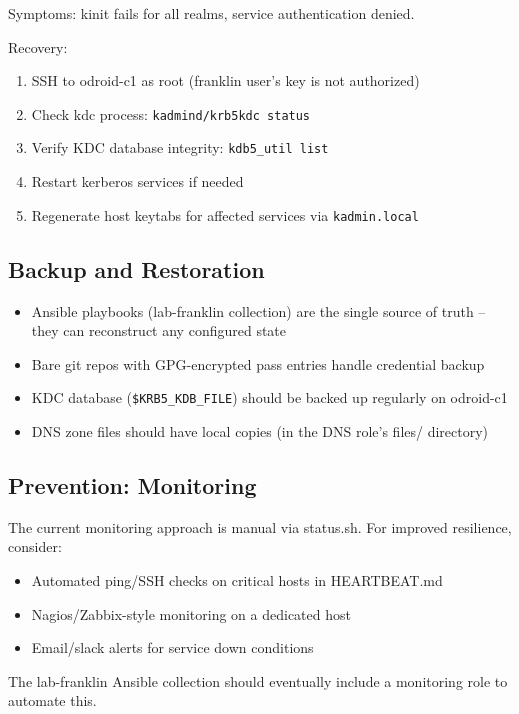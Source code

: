 Symptoms: kinit fails for all realms, service authentication denied.

Recovery:
\begin{enumerate}
    \item SSH to odroid-c1 as root (franklin user's key is not authorized)
    
    \item Check kdc process: \texttt{kadmind/krb5kdc status}
    
    \item Verify KDC database integrity: \texttt{kdb5_util list}
    
    \item Restart kerberos services if needed
    
    \item Regenerate host keytabs for affected services via \texttt{kadmin.local}
\end{enumerate}

\subsection{Backup and Restoration}

\begin{itemize}
    \item Ansible playbooks (lab-franklin collection) are the single source of truth -- they can reconstruct any configured state
    
    \item Bare git repos with GPG-encrypted pass entries handle credential backup
    
    \item KDC database (\texttt{\$KRB5\_KDB\_FILE}) should be backed up regularly on odroid-c1
    
    \item DNS zone files should have local copies (in the DNS role's files/ directory)
\end{itemize}

\subsection{Prevention: Monitoring}

The current monitoring approach is manual via status.sh. For improved resilience, consider:
\begin{itemize}
    \item Automated ping/SSH checks on critical hosts in HEARTBEAT.md
    
    \item Nagios/Zabbix-style monitoring on a dedicated host
    
    \item Email/slack alerts for service down conditions
\end{itemize}

The lab-franklin Ansible collection should eventually include a monitoring role to automate this.
